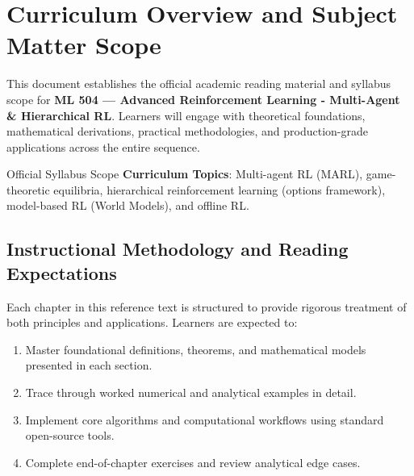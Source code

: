 \section{Curriculum Overview and Subject Matter Scope}

This document establishes the official academic reading material and syllabus scope for \textbf{ML 504 --- Advanced Reinforcement Learning - Multi-Agent \& Hierarchical RL}. Learners will engage with theoretical foundations, mathematical derivations, practical methodologies, and production-grade applications across the entire sequence.

\begin{InsightBox}{Official Syllabus Scope}
  \textbf{Curriculum Topics}: Multi-agent RL (MARL), game-theoretic equilibria, hierarchical reinforcement learning (options framework), model-based RL (World Models), and offline RL.
\end{InsightBox}

\subsection{Instructional Methodology and Reading Expectations}

Each chapter in this reference text is structured to provide rigorous treatment of both principles and applications. Learners are expected to:
\begin{enumerate}
  \item Master foundational definitions, theorems, and mathematical models presented in each section.
  \item Trace through worked numerical and analytical examples in detail.
  \item Implement core algorithms and computational workflows using standard open-source tools.
  \item Complete end-of-chapter exercises and review analytical edge cases.
\end{enumerate}

